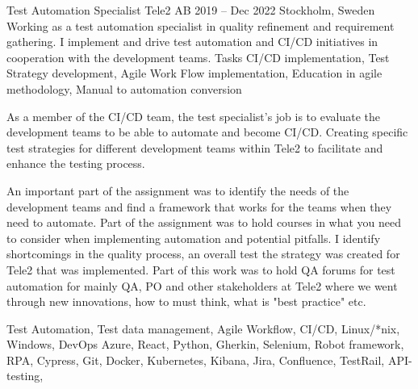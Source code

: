 \documentclass{sobCV}[2015/09/08]
\begin{document}
\experiencenode
   {Test Automation Specialist}
   {Tele2 AB}
   {2019 -- Dec 2022}
   {Stockholm, Sweden}{
       Working as a test automation specialist in quality refinement and
       requirement gathering. I implement and drive test automation and CI/CD
       initiatives in cooperation with the development teams.
   }
   {Tasks}{
      CI/CD implementation,
      Test Strategy development, 
      Agile Work Flow implementation,
      Education in agile methodology,
      Manual to automation conversion
   }{
        {
           As a member of the CI/CD team, the test specialist's job is to
           evaluate the development teams to be able to automate and become
           CI/CD. Creating specific test strategies for different development
           teams within Tele2 to facilitate and enhance the testing process.
       }

        {
           An important part of the assignment was to identify the needs of the
           development teams and find a framework that works for the teams when
           they need to automate. Part of the assignment was to hold courses in
           what you need to consider when implementing automation and potential
           pitfalls.
       }
        {
           I identify shortcomings in the quality process, an overall test
           the strategy was created for Tele2 that was implemented. Part of this
           work was to hold QA forums for test automation for mainly QA, PO and
           other stakeholders at Tele2 where we went through new innovations,
           how to must think, what is "best practice" etc.
       }
   }{
       Test Automation,
       Test data management,
       Agile Workflow, 
       CI/CD, 
       Linux/*nix, 
       Windows, 
       DevOps Azure, 
       React, 
       Python, 
       Gherkin, 
       Selenium, 
       Robot framework,
       RPA,
       Cypress, 
       Git, 
       Docker, 
       Kubernetes, 
       Kibana, 
       Jira, 
       Confluence, 
       TestRail, 
       API-testing, 
   }
   
\end{document}
